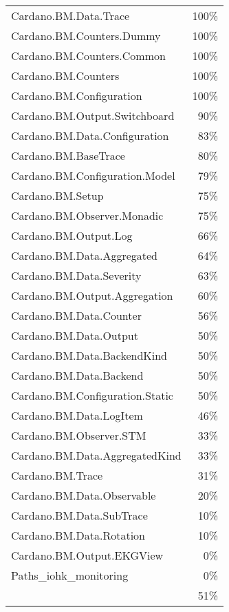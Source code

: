 \begin{tabular}{l r}
   Cardano.BM.Data.Trace & 100\% \\
   Cardano.BM.Counters.Dummy & 100\% \\
   Cardano.BM.Counters.Common & 100\% \\
   Cardano.BM.Counters & 100\% \\
   Cardano.BM.Configuration & 100\% \\
   Cardano.BM.Output.Switchboard & 90\% \\
   Cardano.BM.Data.Configuration & 83\% \\
   Cardano.BM.BaseTrace & 80\% \\
   Cardano.BM.Configuration.Model & 79\% \\
   Cardano.BM.Setup & 75\% \\
   Cardano.BM.Observer.Monadic & 75\% \\
   Cardano.BM.Output.Log & 66\% \\
   Cardano.BM.Data.Aggregated & 64\% \\
   Cardano.BM.Data.Severity & 63\% \\
   Cardano.BM.Output.Aggregation & 60\% \\
   Cardano.BM.Data.Counter & 56\% \\
   Cardano.BM.Data.Output & 50\% \\
   Cardano.BM.Data.BackendKind & 50\% \\
   Cardano.BM.Data.Backend & 50\% \\
   Cardano.BM.Configuration.Static & 50\% \\
   Cardano.BM.Data.LogItem & 46\% \\
   Cardano.BM.Observer.STM & 33\% \\
   Cardano.BM.Data.AggregatedKind & 33\% \\
   Cardano.BM.Trace & 31\% \\
   Cardano.BM.Data.Observable & 20\% \\
   Cardano.BM.Data.SubTrace & 10\% \\
   Cardano.BM.Data.Rotation & 10\% \\
   Cardano.BM.Output.EKGView & 0\% \\
   Paths\_iohk\_monitoring & 0\% \\
    & 51\% \\
\end{tabular}
